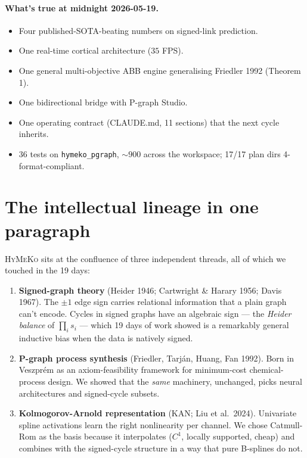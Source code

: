 \documentclass[11pt,a4paper]{article}
\theoremstyle{plain}
\theoremstyle{definition}
\newcommand{\HyMeKo}{\textsc{HyMeKo}}
\newcommand{\code}[1]{\texttt{\small #1}}
\begin{document}
\paragraph{What's true at midnight 2026-05-19.}
\begin{itemize}[itemsep=1pt]
\item Four published-SOTA-beating numbers on signed-link prediction.
\item One real-time cortical architecture ($35$ FPS).
\item One general multi-objective ABB engine generalising Friedler 1992 (Theorem 1).
\item One bidirectional bridge with P-graph Studio.
\item One operating contract (CLAUDE.md, 11 sections) that the next cycle inherits.
\item 36 tests on \code{hymeko\_pgraph}, ${\sim}900$ across the workspace; 17/17 plan dirs 4-format-compliant.
\end{itemize}

\section{The intellectual lineage in one paragraph}

\HyMeKo{} sits at the confluence of three independent threads, all
of which we touched in the 19 days:

\begin{enumerate}
  \item \textbf{Signed-graph theory} (Heider 1946; Cartwright \&
        Harary 1956; Davis 1967). The $\pm 1$ edge sign carries
        relational information that a plain graph can't encode.
        Cycles in signed graphs have an algebraic sign --- the
        \emph{Heider balance} of $\prod_i s_i$ --- which 19 days of
        work showed is a remarkably general inductive bias when
        the data is natively signed.
  \item \textbf{P-graph process synthesis} (Friedler, Tarj\'an,
        Huang, Fan 1992). Born in Veszpr\'em as an
        axiom-feasibility framework for minimum-cost chemical-process
        design. We showed that the \emph{same} machinery,
        unchanged, picks neural architectures and signed-cycle
        subsets.
  \item \textbf{Kolmogorov-Arnold representation} (KAN; Liu et al.\ 2024).
        Univariate spline activations learn the right
        nonlinearity per channel. We chose Catmull-Rom as the
        basis because it interpolates ($C^1$, locally supported,
        cheap) and combines with the signed-cycle structure in
        a way that pure B-splines do not.
\end{enumerate}
\end{document}
